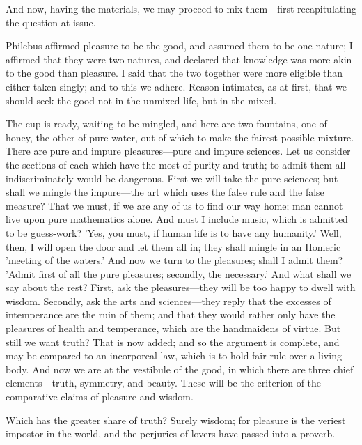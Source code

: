 \documentclass[11pt,letter]{article}
\begin{document}
\par  And now, having the materials, we may proceed to mix them—first recapitulating the question at issue.

\par  Philebus affirmed pleasure to be the good, and assumed them to be one nature; I affirmed that they were two natures, and declared that knowledge was more akin to the good than pleasure. I said that the two together were more eligible than either taken singly; and to this we adhere. Reason intimates, as at first, that we should seek the good not in the unmixed life, but in the mixed.

\par  The cup is ready, waiting to be mingled, and here are two fountains, one of honey, the other of pure water, out of which to make the fairest possible mixture. There are pure and impure pleasures—pure and impure sciences. Let us consider the sections of each which have the most of purity and truth; to admit them all indiscriminately would be dangerous. First we will take the pure sciences; but shall we mingle the impure—the art which uses the false rule and the false measure? That we must, if we are any of us to find our way home; man cannot live upon pure mathematics alone. And must I include music, which is admitted to be guess-work? 'Yes, you must, if human life is to have any humanity.' Well, then, I will open the door and let them all in; they shall mingle in an Homeric 'meeting of the waters.' And now we turn to the pleasures; shall I admit them? 'Admit first of all the pure pleasures; secondly, the necessary.' And what shall we say about the rest? First, ask the pleasures—they will be too happy to dwell with wisdom. Secondly, ask the arts and sciences—they reply that the excesses of intemperance are the ruin of them; and that they would rather only have the pleasures of health and temperance, which are the handmaidens of virtue. But still we want truth? That is now added; and so the argument is complete, and may be compared to an incorporeal law, which is to hold fair rule over a living body. And now we are at the vestibule of the good, in which there are three chief elements—truth, symmetry, and beauty. These will be the criterion of the comparative claims of pleasure and wisdom.

\par  Which has the greater share of truth? Surely wisdom; for pleasure is the veriest impostor in the world, and the perjuries of lovers have passed into a proverb.
\end{document}
